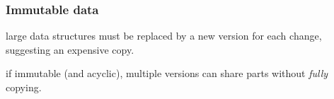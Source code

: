 \documentclass[compress]{beamer}
\begin{document}
\begin{frame}
\frametitle{Immutable data}

\begin{description}
\item[Curse of immutable data:] large data structures must be replaced by a new version for each change, suggesting an expensive copy.
\item<2->[Blessing of immutable data:] if immutable (and acyclic), multiple versions can share parts without {\it fully} copying.
\end{description}

\begin{columns}

\vspace{1 cm}
\renewcommand{\arraystretch}{1.5}
\end{columns}
\end{frame}
\end{document}
